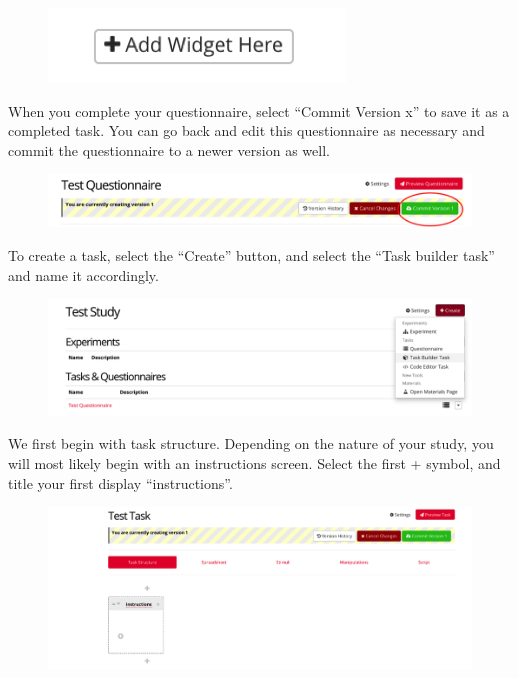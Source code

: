 \documentclass[]{book}
\begin{document}
\begin{figure}
\centering
\includegraphics{images/research_protocols/gorilla/gorilla11.png}
\caption{}
\end{figure}

When you complete your questionnaire, select ``Commit Version x'' to save it as a completed task. You can go back and edit this questionnaire as necessary and commit the questionnaire to a newer version as well.

\begin{figure}
\centering
\includegraphics{images/research_protocols/gorilla/gorilla12.png}
\caption{}
\end{figure}

To create a task, select the ``Create'' button, and select the ``Task builder task'' and name it accordingly.

\begin{figure}
\centering
\includegraphics{images/research_protocols/gorilla/gorilla13.png}
\caption{}
\end{figure}

We first begin with task structure. Depending on the nature of your study, you will most likely begin with an instructions screen. Select the first + symbol, and title your first display ``instructions''.

\begin{figure}
\centering
\includegraphics{images/research_protocols/gorilla/gorilla14.png}
\caption{}
\end{figure}
\end{document}
